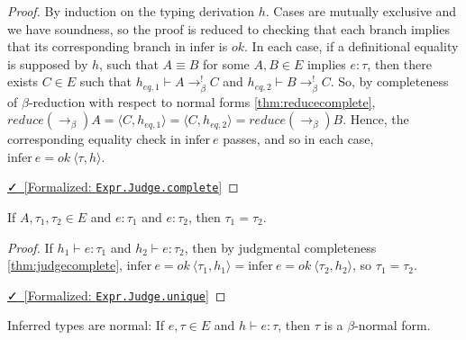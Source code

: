 \documentclass{lmcs}
\newcommand{\tinfer}{\text{infer}}
\newcommand{\leanlink}[2]{
  \href{#1}{\textcolor{black}\faCheck~[Formalized: \texttt{#2}]}%
}
\newcommand{\arr}{\rightarrow}
\newcommand{\barr}{\arr_{\beta}}
\begin{document}
\begin{proof}
  By induction on the typing derivation \(h\). Cases are mutually exclusive and we have soundness, so the proof is reduced to checking that each branch implies that its corresponding branch in \(\tinfer\) is \(ok\). In each case, if a definitional equality is supposed by \(h\), such that \(A \equiv B\) for some \(A, B \in E\) implies \(e : \tau\), then there exists \(C \in E\) such that \(h_{eq,1} \vdash A \barr^{!} C\) and \(h_{eq,2} \vdash B \barr^{!} C\). So, by completeness of \(\beta\)-reduction with respect to normal forms \ref{thm:reducecomplete}, \(reduce (\barr) A = \langle C, h_{eq,1} \rangle = \langle C, h_{eq,2} \rangle = reduce (\barr) B\). Hence, the corresponding equality check in \(\tinfer\ e\) passes, and so in each case, \(\tinfer\ e = ok\ \langle \tau, h \rangle\).

  \noindent \leanlink{https://github.com/lexzaiello/DCC/blob/fb7acf6d9644df7d13c809d12609b59eaca5c763/Dcc/Metatheory/Decidability.lean\#L135}{Expr.Judge.complete}
\end{proof}

\begin{thm}\label{thm:judgeunique}
  If \(A, \tau_1, \tau_2 \in E\) and \(e : \tau_1\) and \(e : \tau_2\), then \(\tau_1 = \tau_2\).
\end{thm}

\begin{proof}
  If \(h_1 \vdash e : \tau_1\) and \(h_2 \vdash e : \tau_2\), then by judgmental completeness \ref{thm:judgecomplete}, \(\tinfer\ e = ok\ \langle \tau_1, h_1 \rangle = \tinfer\ e = ok\ \langle \tau_2, h_2 \rangle\), so \(\tau_1 = \tau_2\).

  \noindent \leanlink{https://github.com/lexzaiello/DCC/blob/fb7acf6d9644df7d13c809d12609b59eaca5c763/Dcc/Metatheory/Decidability.lean\#L138}{Expr.Judge.unique}
\end{proof}

\begin{thm}\label{thm:judgenorm}
  Inferred types are normal: If \(e, \tau \in E\) and \(h \vdash e : \tau\), then \(\tau\) is a \(\beta\)-normal form.
\end{thm}
\end{document}
